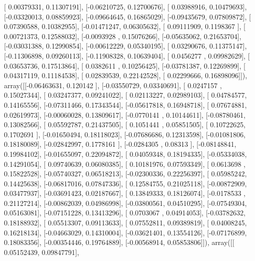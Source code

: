 \documentclass{article}
\begin{document}
       [ 0.00379331,  0.11307191],
       [-0.06210725,  0.12700676],
       [ 0.03988916,  0.10479693],
       [-0.03320013,  0.08859923],
       [-0.09664645,  0.16865029],
       [-0.09435679,  0.07809872],
       [ 0.07390588,  0.10382955],
       [-0.01471247,  0.06305632],
       [ 0.09111909,  0.1198367 ],
       [ 0.00721373,  0.12588032],
       [-0.0093928 ,  0.15076266],
       [-0.05635062,  0.21653704],
       [-0.03031388,  0.12990854],
       [-0.00612229,  0.05340195],
       [ 0.03290676,  0.11375147],
       [-0.11306898,  0.09260113],
       [-0.11908328,  0.10639404],
       [ 0.0456277 ,  0.09982629],
       [ 0.03653736,  0.17513864],
       [ 0.0382611 ,  0.10256425],
       [-0.03781387,  0.12269899],
       [ 0.04317119,  0.11184538],
       [ 0.02839539,  0.22142528],
       [ 0.02299666,  0.16898096]]), array([[-0.06463631,  0.120142  ],
       [-0.03550729,  0.03340691],
       [ 0.0247157 ,  0.15027344],
       [ 0.03247377,  0.09241022],
       [ 0.02113227,  0.02989103],
       [ 0.04784577,  0.14165556],
       [-0.07311466,  0.17343544],
       [-0.05617818,  0.16948718],
       [ 0.07674881,  0.02619973],
       [-0.00060028,  0.13809617],
       [-0.0770141 ,  0.10144611],
       [-0.08780461,  0.13082566],
       [ 0.05592787,  0.21437505],
       [ 0.1051441 ,  0.05851505],
       [ 0.10722625,  0.1702691 ],
       [-0.01650494,  0.18118023],
       [-0.07686686,  0.12313598],
       [-0.01081806,  0.18180089],
       [-0.02842997,  0.1778161 ],
       [-0.0284305 ,  0.08313   ],
       [-0.08148841,  0.19984102],
       [-0.01655097,  0.22094872],
       [ 0.04059348,  0.18194335],
       [-0.05334038,  0.14291054],
       [ 0.09740639,  0.06080385],
       [ 0.10181976,  0.07593349],
       [ 0.0613698 ,  0.15822528],
       [-0.05740327,  0.06518213],
       [-0.02300336,  0.22256397],
       [ 0.05985242,  0.14425638],
       [-0.06817016,  0.07847336],
       [ 0.12584755,  0.21025118],
       [-0.00872909,  0.03477937],
       [-0.03691423,  0.02187667],
       [ 0.13849333,  0.18126074],
       [-0.0178533 ,  0.21127214],
       [-0.00862039,  0.04986998],
       [-0.03800561,  0.04510295],
       [-0.07549304,  0.05163081],
       [-0.07151228,  0.13413296],
       [ 0.0703067 ,  0.04914053],
       [-0.03782632,  0.18188932],
       [ 0.05513307,  0.09113633],
       [ 0.07552811,  0.09389819],
       [ 0.04008245,  0.16218134],
       [-0.04663029,  0.14310004],
       [-0.03621401,  0.13554126],
       [-0.07176899,  0.18083356],
       [-0.00354446,  0.19764889],
       [-0.00568914,  0.05853806]]), array([[ 0.05152439,  0.09847791],
\end{document}
